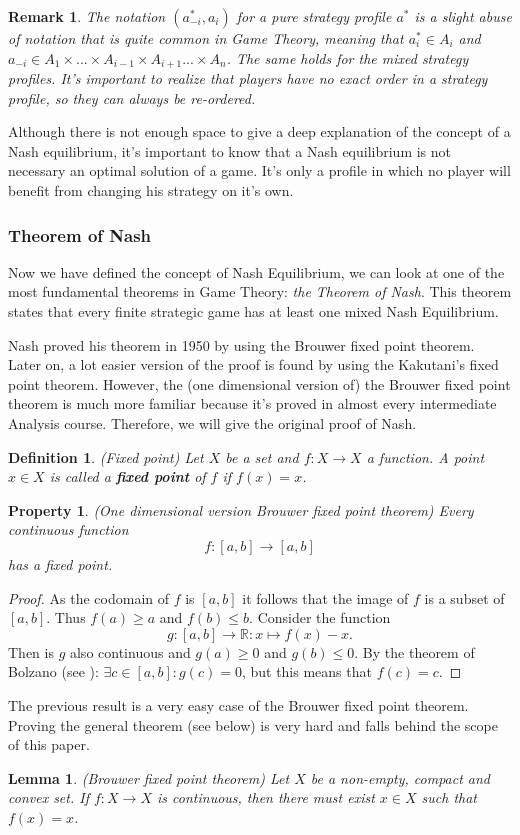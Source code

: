 \documentclass[a4paper,11pt]{article}
\newtheorem{lemma}[theorem]{Lemma}
\newtheorem{property}[theorem]{Property}
\newtheorem{definition}[theorem]{Definition}
\newtheorem{remark}[theorem]{Remark}
\newcommand{\R}{{\mathbb R}}
\begin{document}
\begin{remark}\label{herordening}
The notation $(a_{-i}^*, a_{i})$ for a pure strategy profile $a^*$ is a slight abuse of notation that is quite common in Game Theory, meaning that $a_i^* \in A_i$ and $a_{-i} \in A_1\times ... \times A_{i-1} \times A_{i+1} ... \times A_n$. The same holds for the mixed strategy profiles. It's important to realize that players have no exact order in a strategy profile, so they can always be re-ordered.
\end{remark}

Although there is not enough space to give a deep explanation of the concept of a Nash equilibrium, it's important to know that a Nash equilibrium is not necessary an optimal solution of a game. It's only a profile in which no player will benefit from changing his strategy on it's own.

\subsubsection{Theorem of Nash}
Now we have defined the concept of Nash Equilibrium, we can look at one of the most fundamental theorems in Game Theory: \emph{the Theorem of Nash}. This theorem states that every finite strategic game has at least one mixed Nash Equilibrium.

Nash proved his theorem in 1950 by using the Brouwer fixed point theorem. Later on, a lot easier version of the proof is found by using the Kakutani's fixed point theorem. However, the (one dimensional version of) the Brouwer fixed point theorem is much more familiar because it's proved in almost every intermediate Analysis course. Therefore, we will give the original proof of Nash.

\begin{definition}(Fixed point)\cite{111}
Let $X$ be a set and $f: X \rightarrow X$ a function. A point $x \in X$ is called a \textbf{fixed point} of $f$ if $f(x)=x$.
\end{definition}

\begin{property}(One dimensional version Brouwer fixed point theorem) \cite{111}
 Every continuous function $$f: [a,b] \rightarrow [a,b]$$  has a fixed point.
\end{property}
\begin{proof}
As the codomain of $f$ is $[a,b]$ it follows that the image of $f$ is a subset of $[a,b]$. Thus $f(a) \geq a$ and $f(b) \leq b$. Consider the function $$g: [a,b] \rightarrow \R: x \mapsto f(x) - x.$$
Then is $g$ also continuous and $g(a) \geq 0$ and $g(b) \leq 0$. By the theorem of Bolzano (see \cite{111}): $\exists c \in [a, b]: g(c) = 0$, but this means that $f(c) = c$.
\end{proof}
 The previous result is a very easy case of the Brouwer fixed point theorem. Proving the general theorem (see below) is very hard and falls behind the scope of this paper.
\begin{lemma}(Brouwer fixed point theorem)
Let $X$ be a non-empty, compact and convex set. If $f : X \rightarrow X$ is continuous, then there must exist $x \in X$ such that $f(x) = x$.
\end{lemma}
\end{document}
